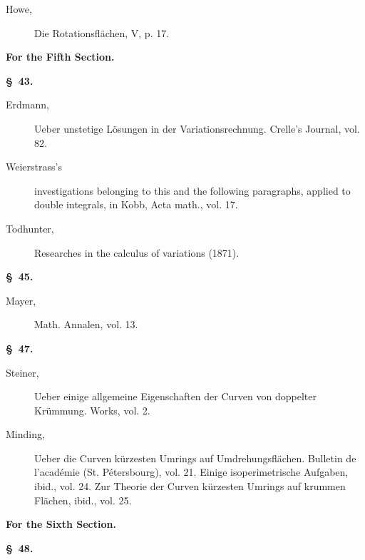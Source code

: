 \documentclass[11pt,a4paper,leqno]{article}
\begin{document}
\begin{description}
\item[Howe,] Die Rotationsflächen, V, p. 17.
\end{description}

\begin{center}
{\large\bfseries For the Fifth Section.}

{\bfseries \S~43.}
\end{center}

\begin{description}
\item[Erdmann,] Ueber unstetige Lösungen in der Variationsrechnung. Crelle's
Journal, vol. 82.

\item[Weierstrass's] investigations belonging to this and the following
paragraphs, applied to double integrals, in Kobb, Acta math., vol. 17.

\item[Todhunter,] Researches in the calculus of variations (1871).
\end{description}

\begin{center}{\bfseries \S~45.}\end{center}

\begin{description}
\item[Mayer,] Math. Annalen, vol. 13.
\end{description}

\begin{center}{\bfseries \S~47.}\end{center}

\begin{description}
\item[Steiner,] Ueber einige allgemeine Eigenschaften der Curven von doppelter
Krümmung. Works, vol. 2.

\item[Minding,] Ueber die Curven kürzesten Umrings auf Umdrehungsflächen.
Bulletin de l'académie (St. Pétersbourg), vol. 21. Einige isoperimetrische
Aufgaben, ibid., vol. 24. Zur Theorie der Curven kürzesten Umrings auf krummen
Flächen, ibid., vol. 25.
\end{description}

\begin{center}
{\large\bfseries For the Sixth Section.}

{\bfseries \S~48.}
\end{center}
\end{document}
